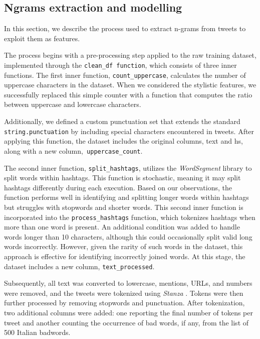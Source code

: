 \subsection{Ngrams extraction and modelling}

In this section, we describe the process used to extract n-grams from tweets to exploit them as features.

The process begins with a pre-processing step applied to the raw training dataset, implemented through the \texttt{clean\_df function}, which consists of three inner functions. The first inner function, \texttt{count\_uppercase}, calculates the number of uppercase characters in the dataset.
When we considered the stylistic features, we successfully replaced this simple counter with a function that computes the ratio between uppercase and lowercase characters.

Additionally, we defined a custom punctuation set that extends the standard \texttt{string.punctuation} by including special characters encountered in tweets. After applying this function, the dataset includes the original columns, text and hs, along with a new column,\texttt{ uppercase\_count}.

The second inner function, \texttt{split\_hashtags}, utilizes the \emph{WordSegment} library to split words within hashtags. This function is stochastic, meaning it may split hashtags differently during each execution. Based on our observations, the function performs well in identifying and splitting longer words within hashtags but struggles with stopwords and shorter words.
This second inner function is incorporated into the \texttt{process\_hashtags} function, which tokenizes hashtags when more than one word is present.
An additional condition was added to handle words longer than 10 characters, although this could occasionally split valid long words incorrectly.
However, given the rarity of such words in the dataset, this approach is effective for identifying incorrectly joined words.
At this stage, the dataset includes a new column, \texttt{text\_processed}.

Subsequently, all text was converted to lowercase, mentions, URLs, and numbers were removed, and the tweets were tokenized using \emph{Stanza} \cite{stanza}.
Tokens were then further processed by removing stopwords and punctuation.
After tokenization, two additional columns were added: one reporting the final number of tokens per tweet and another counting the occurrence of bad words, if any, from the list of 500 Italian badwords.

